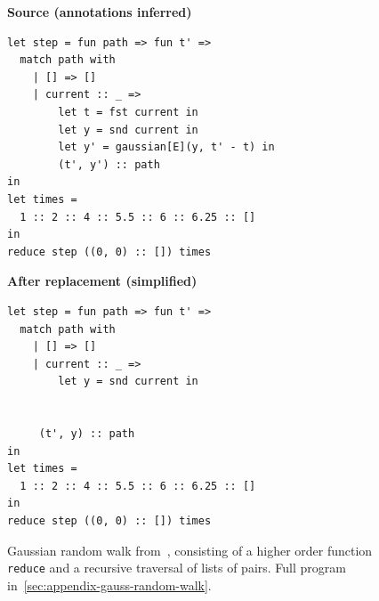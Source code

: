 \begin{figure}[htbp]
\centering
\begin{minipage}[t]{.48\linewidth}
\raggedright\textbf{Source (annotations inferred)}
\begin{lstlisting}[xleftmargin=0pt]
let step = fun path => fun t' =>
  match path with
    | [] => []
    | current :: _ =>
        let t = fst current in
        let y = snd current in
        let y' = gaussian[E](y, t' - t) in
        (t', y') :: path
in
let times =
  1 :: 2 :: 4 :: 5.5 :: 6 :: 6.25 :: []
in
reduce step ((0, 0) :: []) times
\end{lstlisting}
\end{minipage}\hfill
\begin{minipage}[t]{.48\linewidth}
\raggedright\textbf{After replacement (simplified)}
\begin{lstlisting}[xleftmargin=0pt]
let step = fun path => fun t' =>
  match path with
    | [] => []
    | current :: _ =>
        let y = snd current in
     	
	
	 (t', y) :: path
in
let times =
  1 :: 2 :: 4 :: 5.5 :: 6 :: 6.25 :: []
in
reduce step ((0, 0) :: []) times
\end{lstlisting}
\end{minipage}
\caption{Gaussian random walk from~\cite{vakar2019domain}, consisting of a higher order function \texttt{reduce} and a recursive traversal of lists of pairs. Full program in~\cref{sec:appendix-gauss-random-walk}.}
\label{fig:intro-gaussian-walk}
\end{figure}
